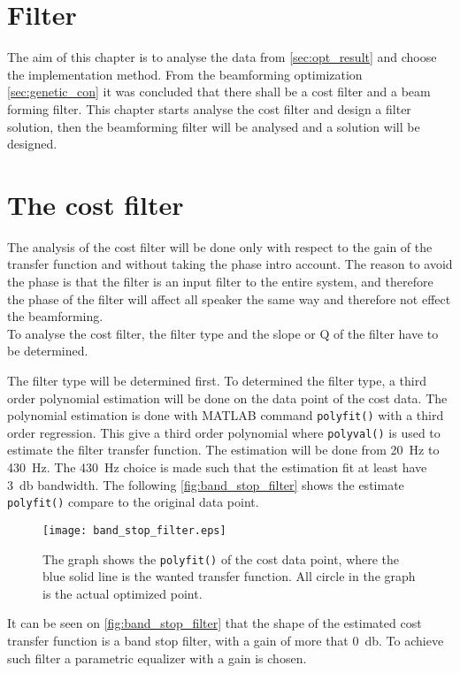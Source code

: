 \section{Filter}\label{sec:filter_design}

The aim of this chapter is to analyse the data from \ref{sec:opt_result} and choose the implementation method. From the beamforming optimization \autoref{sec:genetic_con} it was concluded that there shall be a cost filter and a beam forming filter. This chapter starts analyse the cost filter and design a filter solution, then the beamforming filter will be analysed and a solution will be designed.


\section{The cost filter}
The analysis of the cost filter will be done only with respect to the gain of the transfer function and without taking the phase intro account. The reason to avoid the phase is that the filter is an input filter to the entire system, and therefore the phase of the filter will affect all speaker the same way and therefore not effect the beamforming. \\
To analyse the cost filter, the filter type and the slope or Q of the filter have to be determined. 

The filter type will be determined first. To determined the filter type, a third order polynomial estimation will be done on the data point of the cost data. The polynomial estimation is done with MATLAB command \texttt{polyfit()} with a third order regression. This give a third order polynomial where  \texttt{polyval()} is used to estimate the filter transfer function. The estimation will be done from \SI{20}{\hertz} to \SI{430}{\hertz}. The \SI{430}{\hertz} choice is made such that the estimation fit at least have \SI{3}{\decibel} bandwidth. The following \autoref{fig:band_stop_filter} shows the estimate  \texttt{polyfit()} compare to the original data point.

\begin{figure}[H]
	\centering
	\texttt{[image: band\_stop\_filter.eps]}
	\caption{The graph shows the \texttt{polyfit()} of the cost data point, where the blue solid line is the wanted transfer function. All circle in the graph is the actual optimized point.}
		\label{fig:band_stop_filter}
\end{figure}

It can be seen on \autoref{fig:band_stop_filter} that the shape of the estimated cost transfer function is a band stop filter, with a gain of more that \SI{0}{\decibel}. To achieve such filter a parametric equalizer with a gain is chosen. \\


